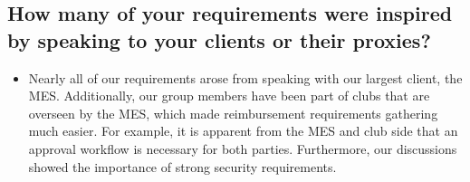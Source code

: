 \documentclass[12pt]{article}
\begin{document}
  \subsection{How many of your requirements were inspired by speaking to your clients or their proxies?}
    \begin{itemize}
      \item Nearly all of our requirements arose from speaking with our largest client, the MES. Additionally, our group members have been part of clubs that are overseen by the MES, which made reimbursement requirements gathering much easier. For example, it is apparent from the MES and club side that an approval workflow is necessary for both parties. Furthermore, our discussions showed the importance of strong security requirements.
    \end{itemize}
\end{document}
